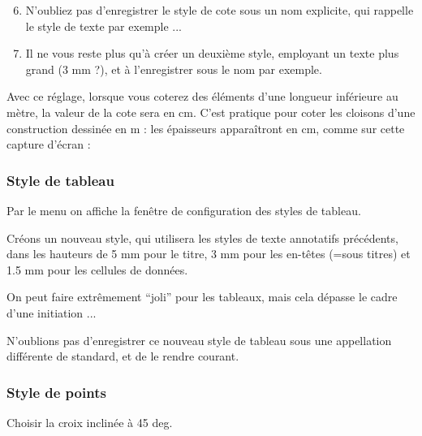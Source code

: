 \documentclass[a4paper,12pt,french]{sphinxmanual}
\begin{document}
\begin{figure}[htbp]
\centering

\noindent{}
\end{figure}
\begin{enumerate}
\setcounter{enumi}{5}
\item {} 
N'oubliez pas d'enregistrer le style de cote sous un nom explicite, qui rappelle le style de texte par exemple ...

\item {} 
Il ne vous reste plus qu'à créer un deuxième style, employant un texte plus grand (3 mm ?), et à l'enregistrer sous le nom  par exemple.

\end{enumerate}

Avec ce réglage, lorsque vous coterez des éléments d'une longueur inférieure au mètre, la valeur de la cote sera en cm. C'est pratique pour coter les cloisons d'une construction dessinée en m : les épaisseurs apparaîtront en cm, comme sur cette capture d'écran :
\begin{figure}[htbp]
\centering

\noindent{}
\end{figure}


\subsubsection{Style de tableau}
\label{acad/config_acad:style-de-tableau}
Par le menu  on affiche la fenêtre de configuration des styles de tableau.

Créons un nouveau style, qui utilisera les styles de texte annotatifs précédents, dans les hauteurs de 5 mm pour le titre, 3 mm pour les en-têtes (=sous titres) et 1.5 mm pour les cellules de données.
\begin{figure}[htbp]
\centering

\noindent{}
\end{figure}

On peut faire extrêmement ``joli'' pour les tableaux, mais cela dépasse le cadre d'une initiation ...

N'oublions pas d'enregistrer ce nouveau style de tableau sous une appellation différente de standard, et de le rendre courant.


\subsubsection{Style de points}
\label{acad/config_acad:style-de-points}
Choisir la croix inclinée à 45 deg.
\end{document}
